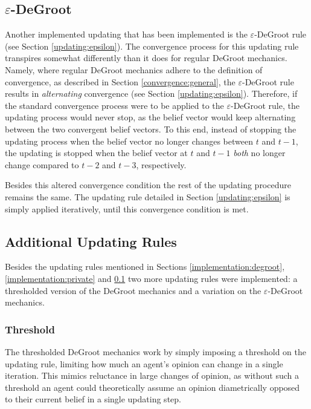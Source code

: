 \documentclass[a4paper, 12pt]{report}
\begin{document}
\subsection{$\varepsilon$-DeGroot}
\label{implementation:epsilon}
Another implemented updating that has been implemented is the $\varepsilon$-DeGroot rule (see Section \ref{updating:epsilon}). The convergence process for this updating rule transpires somewhat differently than it does for regular DeGroot mechanics. Namely, where regular DeGroot mechanics adhere to the definition of convergence, as described in Section \ref{convergence:general}, the $\varepsilon$-DeGroot rule results in \emph{alternating} convergence (see Section \ref{updating:epsilon}). Therefore, if the standard convergence process were to be applied to the $\varepsilon$-DeGroot rule, the updating process would never stop, as the belief vector would keep alternating between the two convergent belief vectors. To this end, instead of stopping the updating process when the belief vector no longer changes between $t$ and $t-1$, the updating is stopped when the belief vector at $t$ and $t-1$ \emph{both} no longer change compared to $t-2$ and $t-3$, respectively. 

\noindent Besides this altered convergence condition the rest of the updating procedure remains the same. The updating rule detailed in Section \ref{updating:epsilon} is simply applied iteratively, until this convergence condition is met.

\subsection{Additional Updating Rules}

Besides the updating rules mentioned in Sections \ref{implementation:degroot}, \ref{implementation:private} and \ref{implementation:epsilon} two more updating rules were implemented: a thresholded version of the DeGroot mechanics and a variation on the $\varepsilon$-DeGroot mechanics.

\subsubsection{Threshold}
\label{implementation:threshold}
The thresholded DeGroot mechanics work by simply imposing a threshold on the updating rule, limiting how much an agent's opinion can change in a single iteration. This mimics reluctance in large changes of opinion, as without such a threshold an agent could theoretically assume an opinion diametrically opposed to their current belief in a single updating step.
\end{document}
